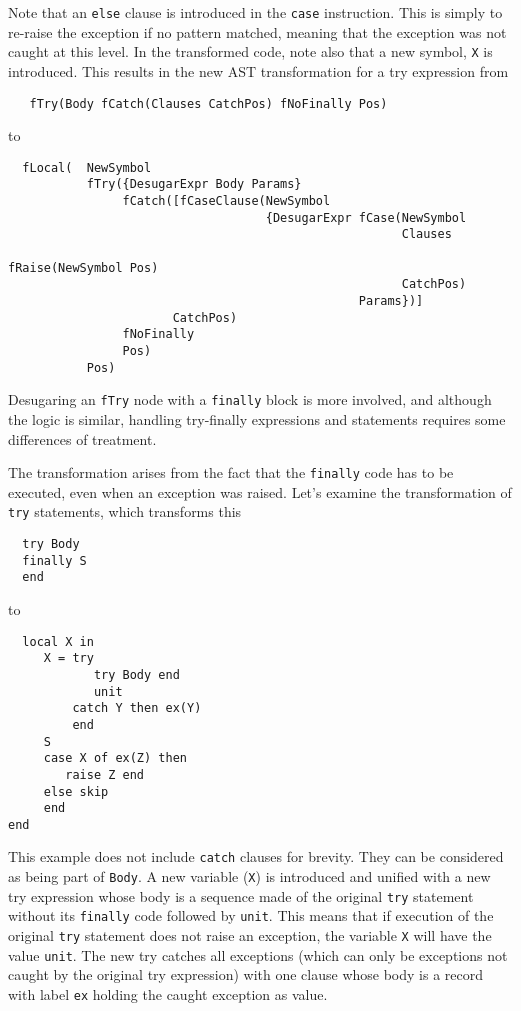 \documentclass[a4paper]{memoir}
\begin{document}
Note that an \lstinline!else! clause is introduced in the \lstinline!case!
instruction. This is simply to re-raise the exception if no pattern matched,
meaning that the exception was not caught at this level.
In the transformed code, note also that a new symbol, \lstinline!X! is
introduced. 
\pagebreak[4]
This results in the new AST transformation for a try expression from
\begin{lstlisting}
   fTry(Body fCatch(Clauses CatchPos) fNoFinally Pos)
\end{lstlisting}
to
\begin{lstlisting}
  fLocal(  NewSymbol
           fTry({DesugarExpr Body Params} 
                fCatch([fCaseClause(NewSymbol 
                                    {DesugarExpr fCase(NewSymbol 
                                                       Clauses 
                                                       fRaise(NewSymbol Pos) 
                                                       CatchPos) 
                                                 Params})] 
                       CatchPos) 
                fNoFinally 
                Pos)
           Pos)
\end{lstlisting}

Desugaring an \lstinline!fTry! node with a \lstinline!finally! block is more
involved, and although the logic is similar, handling try-finally expressions and
statements requires some differences of treatment.

The transformation arises from the fact that the \lstinline!finally! code has to
be executed, even when an exception was raised.
Let's examine the transformation of \lstinline!try! statements, which
transforms this

\begin{lstlisting}
  try Body
  finally S 
  end
\end{lstlisting}

to

\begin{lstlisting}
  local X in 
     X = try 
            try Body end 
            unit 
         catch Y then ex(Y)
         end 
     S 
     case X of ex(Z) then 
        raise Z end 
     else skip 
     end 
end  
\end{lstlisting}

This example does not include \lstinline!catch! clauses for brevity. They can be considered
as being part of \lstinline!Body!.
A new variable (\lstinline!X!) is introduced and unified with a new try
expression whose body is a sequence made of the original \lstinline!try! statement
without its \lstinline!finally! code followed by \lstinline!unit!.
This means that if execution of the original \lstinline!try! statement does not raise an
exception, the variable \lstinline!X! will have the value \lstinline!unit!.
The new try catches all exceptions (which can only be exceptions not caught
by the original try expression) with one clause whose body is a record with label
\lstinline!ex! holding the caught exception as value.
\end{document}
